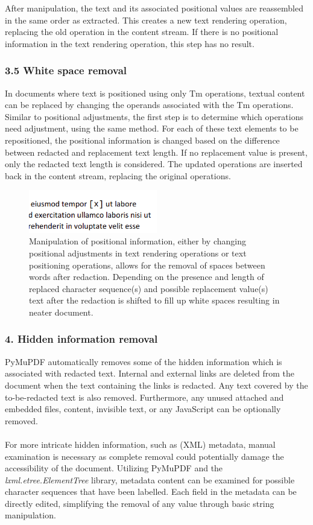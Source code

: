 After manipulation, the text and its associated positional values are reassembled in the same order as extracted. This creates a new text rendering operation, replacing the old operation in the content stream. If there is no positional information in the text rendering operation, this step has no result.

\subsubsection{3.5 White space removal}
\label{3.5}
In documents where text is positioned using only Tm operations, textual content can be replaced by changing the operands associated with the Tm operations. Similar to positional adjustments, the first step is to determine which operations need adjustment, using the same method. For each of these text elements to be repositioned, the positional information is changed based on the difference between redacted and replacement text length. If no replacement value is present, only the redacted text length is considered. The updated operations are inserted back in the content stream, replacing the original operations.

\begin{figure}[h]
\includegraphics[width=0.5\textwidth]{latex/media/annotres.png}
\centering
\caption{Manipulation of positional information, either by changing positional adjustments in text rendering operations or text positioning operations, allows for the removal of spaces between words after redaction. Depending on the presence and length of replaced character sequence(s) and possible replacement value(s) text after the redaction is shifted to fill up white spaces resulting in neater document.}
\label{fig:redactannot}
\end{figure}
\subsubsection{4. Hidden information removal}
PyMuPDF automatically removes some of the hidden information which is associated with redacted text. Internal and external links are deleted from the document when the text containing the links is redacted. Any text covered by the to-be-redacted text is also removed. Furthermore, any unused attached and embedded files, content, invisible text, or any JavaScript can be optionally removed.
\\\\
For more intricate hidden information, such as (XML) metadata, manual examination is necessary as complete removal could potentially damage the accessibility of the document. Utilizing PyMuPDF and the \textit{lxml.etree.ElementTree} library, metadata content can be examined for possible character sequences that have been labelled. Each field in the metadata can be directly edited, simplifying the removal of any value through basic string manipulation.

